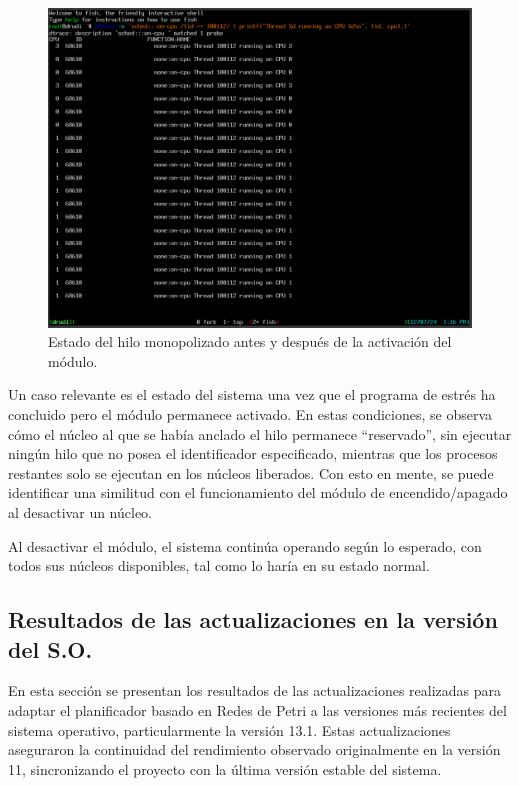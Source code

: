 \begin{figure}[H]
    \centering
    \includegraphics[width=1\textwidth]{images/cpuMonopolized-dtrace.png}
    \caption{Estado del hilo monopolizado antes y después de la activación del módulo.}
    \label{fig:cpuMonopolized-dtrace}
\end{figure}

Un caso relevante es el estado del sistema una vez que el programa de estrés ha concluido pero el módulo permanece activado. En estas condiciones, se observa cómo el núcleo al que se había anclado el hilo permanece “reservado”, sin ejecutar ningún hilo que no posea el identificador especificado, mientras que los procesos restantes solo se ejecutan en los núcleos liberados. Con esto en mente, se puede identificar una similitud con el funcionamiento del módulo de encendido/apagado al desactivar un núcleo.\par

Al desactivar el módulo, el sistema continúa operando según lo esperado, con todos sus núcleos disponibles, tal como lo haría en su estado normal.

\subsection{Resultados de las actualizaciones en la versión del S.O.}

En esta sección se presentan los resultados de las actualizaciones realizadas para adaptar el planificador basado en Redes de Petri a las versiones más recientes del sistema operativo, particularmente la versión 13.1. Estas actualizaciones aseguraron la continuidad del rendimiento observado originalmente en la versión 11, sincronizando el proyecto con la última versión estable del sistema.\par

